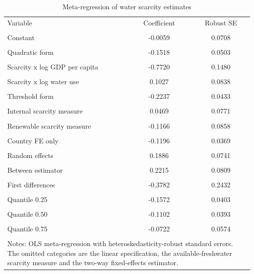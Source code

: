 \begin{table}[htbp]
\centering
\caption{Meta-regression of water scarcity estimates}
\label{tab:meta}
\small
\begin{tabular}{lcc}
\hline
Variable & Coefficient & Robust SE \\\\
\hline
Constant & -0.0059 & 0.0708 \\\\
Quadratic form & -0.1518 & 0.0503 \\\\
Scarcity x log GDP per capita & -0.7720 & 0.1480 \\\\
Scarcity x log water use & 0.1027 & 0.0838 \\\\
Threshold form & -0.2237 & 0.0433 \\\\
Internal scarcity measure & 0.0469 & 0.0771 \\\\
Renewable scarcity measure & -0.1166 & 0.0858 \\\\
Country FE only & -0.1196 & 0.0369 \\\\
Random effects & 0.1886 & 0.0741 \\\\
Between estimator & 0.2215 & 0.0809 \\\\
First differences & -0.3782 & 0.2432 \\\\
Quantile 0.25 & -0.1572 & 0.0403 \\\\
Quantile 0.50 & -0.1102 & 0.0393 \\\\
Quantile 0.75 & -0.0722 & 0.0574 \\\\
\hline
\multicolumn{3}{p{0.9\textwidth}}{\footnotesize Notes: OLS meta-regression with heteroskedasticity-robust standard errors. The omitted categories are the linear specification, the available-freshwater scarcity measure and the two-way fixed-effects estimator.}
\end{tabular}
\end{table}
